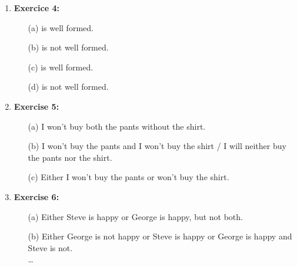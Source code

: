 \documentclass{article} %
\begin{document}
\begin{enumerate}
        \item \textbf{Exercice 4:}
        \begin{itemize}
            \item[(a)] is well formed.
            \item[(b)] is not well formed.
            \item[(c)] is well formed.
            \item[(d)] is not well formed.
        \end{itemize}

        \item \textbf{Exercise 5:}
        \begin{itemize}
            \item[(a)] I won't buy both the pants without the shirt.
            \item[(b)] I won't buy the pants and I won't buy the shirt / I will neither buy the pants nor the shirt.
            \item[(c)] Either I won't buy the pants or won't buy the shirt.
        \end{itemize}

        \item \textbf{Exercise 6:}
        \begin{itemize}
            \item[(a)] Either Steve is happy or George is happy, but not both.
            \item[(b)] Either George is not happy or Steve is happy or George is happy and Steve is not. \\
            \dots
        \end{itemize}
        

\end{enumerate}
\end{document}
